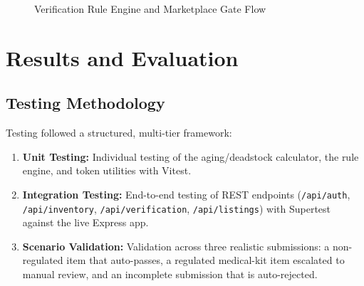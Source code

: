 \documentclass[11pt,a4paper]{report}
\begin{document}
\begin{figure}[h]
\centering
{}
\caption{Verification Rule Engine and Marketplace Gate Flow}
\label{fig:ruleengine}
\end{figure}

\chapter{Results and Evaluation}

\section{Testing Methodology}
Testing followed a structured, multi-tier framework:
\begin{enumerate}[leftmargin=0.8cm]
    \item \textbf{Unit Testing:} Individual testing of the aging/deadstock calculator, the rule engine, and token utilities with Vitest.
    \item \textbf{Integration Testing:} End-to-end testing of REST endpoints (\texttt{/api/auth}, \texttt{/api/inventory}, \texttt{/api/verification}, \texttt{/api/listings}) with Supertest against the live Express app.
    \item \textbf{Scenario Validation:} Validation across three realistic submissions: a non-regulated item that auto-passes, a regulated medical-kit item escalated to manual review, and an incomplete submission that is auto-rejected.
\end{enumerate}
\end{document}

